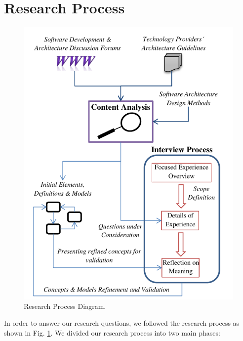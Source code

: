 \documentclass[conference]{IEEEtran}
\begin{document}
\section{Research Process}
\label{sec:process}
\begin{figure}
	\centering
		\includegraphics[scale=0.8]{ResearchProcessDiagram.pdf}
	\caption{Research Process Diagram.}
	\label{fig:ResearchProcess}
\end{figure}
In order to answer our research questions, we followed the research process as
shown in Fig. \ref{fig:ResearchProcess}. We divided our research process into
two main phases:
\end{document}
